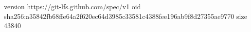 version https://git-lfs.github.com/spec/v1
oid sha256:a35842fb68ffe64a2f620ec64d3985c33581c4388fee196ab9f8d27355ae9770
size 43840
